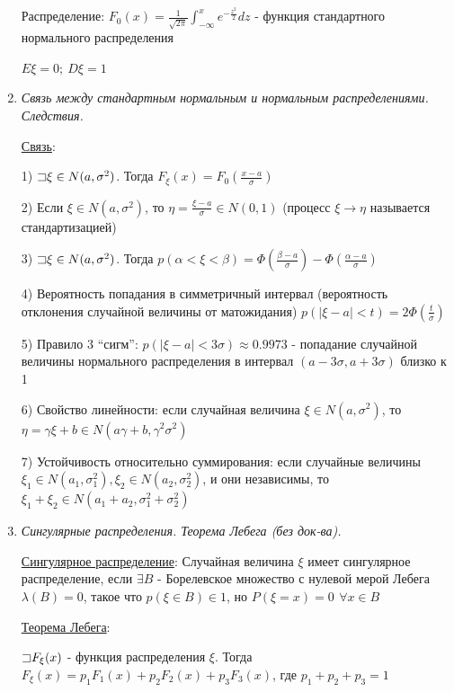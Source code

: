 \documentclass[12pt]{article}
\begin{document}
\begin{enumerate}
    Распределение: $F_0(x) = \frac{1}{\sqrt{2\pi}} \int_{-\infty}^x e^{-\frac{z^2}{2}} dz$ - функция стандартного нормального распределения

    $E\xi = 0; \ D\xi = 1$

    \item \textit{Связь между стандартным нормальным и нормальным распределениями. Следствия.}

    \hyperlink{connectionbetweennormalandstandard}{Связь}: 

    1) $\mathord{\sqsupset} \xi \in N(a, \sigma^2)$. Тогда $F_\xi(x) = F_0\left(\frac{x - a}{\sigma}\right)$

    2) Если $\xi \in N(a, \sigma^2)$, то $\eta = \frac{\xi - a}{\sigma} \in N(0, 1)$ (процесс $\xi \to \eta$ называется стандартизацией)

    3) $\mathord{\sqsupset} \xi \in N(a, \sigma^2)$. Тогда $p(\alpha < \xi < \beta) = \Phi\left(\frac{\beta - a}{\sigma}\right) - \Phi\left(\frac{\alpha - a}{\sigma}\right)$

    4) Вероятность попадания в симметричный интервал (вероятность отклонения случайной величины от матожидания) 
    $p(|\xi - a| < t) = 2\Phi\left(\frac{t}{\sigma}\right)$

    5) Правило 3 \enquote{сигм}: $p(|\xi - a| < 3\sigma) \approx 0.9973$ - попадание случайной величины нормального распределения в интервал $(a - 3\sigma, a + 3\sigma)$ близко к 1

    6) Свойство линейности: если случайная величина $\xi \in N(a, \sigma^2)$, то $\eta = \gamma \xi + b \in N(a \gamma + b, \gamma^2 \sigma^2)$ 
    
    7) Устойчивость относительно суммирования: если случайные величины $\xi_1 \in N(a_1, \sigma_1^2), \xi_2 \in N(a_2, \sigma_2^2)$, и они независимы, то $\xi_1 + \xi_2 \in N(a_1 + a_2, \sigma^2_1 + \sigma^2_2)$

    
    \item \textit{Сингулярные распределения. Теорема Лебега (без док-ва).}

    \hyperlink{singulardistribution}{Сингулярное распределение}: Случайная величина $\xi$ имеет сингулярное распределение, если $\exists B$ - Борелевское множество с нулевой мерой Лебега $\lambda(B) = 0$, такое что $p(\xi \in B) \in 1$, но $P(\xi = x) = 0 \ \, \forall x \in B$

    \hyperlink{lebesguetheorem}{Теорема Лебега}: 

    $\mathord{\sqsupset} F_\xi(x)$ - функция распределения $\xi$. Тогда $F_\xi(x) = p_1 F_1(x) + p_2 F_2(x) + p_3 F_3(x)$, где $p_1 + p_2 + p_3 = 1$


\end{enumerate}
\end{document}
